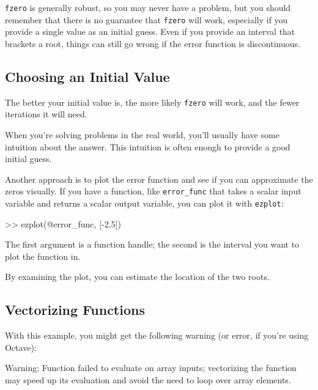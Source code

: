 {\tt fzero} is generally robust, so you may never have a problem, but you should remember that there is no guarantee that {\tt fzero} will work, especially if you provide a single value as an initial guess.  Even if you provide an interval that brackets a root, things can still go wrong if the error function is discontinuous.


\subsection{Choosing an Initial Value}

The better your initial value is, the more likely
{\tt fzero} will work, and the fewer iterations it will
need.

When you're solving problems in the real world, you'll usually
have some intuition about the answer.  This intuition is often enough
to provide a good initial guess.


Another approach is to plot the error function and see if you can
approximate the zeros visually.  If you have a function, like
\verb"error_func" that takes a scalar input variable and returns
a scalar output variable, you can plot it with {\tt ezplot}:

\begin{code}
>> ezplot(@error_func, [-2,5])
\end{code}


The first argument is a function handle; the second is the interval you want to plot the function in.

By examining the plot, you can estimate the location of the two roots.


\subsection{Vectorizing Functions}


With this example, you might get the following warning (or error, if you're using Octave):

\begin{code}
Warning: Function failed to evaluate on array inputs;
vectorizing the function may speed up its evaluation and 
avoid the need to loop over array elements. 
\end{code}

